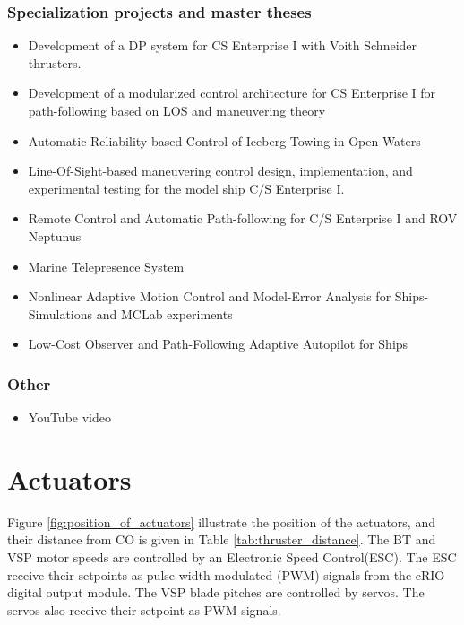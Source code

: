 \subsubsection{Specialization projects and master theses}
\begin{itemize}
	\item Development of a DP system for CS Enterprise I with Voith Schneider thrusters. \citep{Skaatun2011}
	\item Development of a modularized control architecture for CS Enterprise I for path-following based on LOS and maneuvering theory \citep{Tran2013}
	\item Automatic Reliability-based Control of Iceberg Towing in Open Waters \citep{Orsten2014}
	\item Line-Of-Sight-based maneuvering control design, implementation, and experimental testing for the model ship C/S Enterprise I.\citep{Tran2014}
	\item Remote Control and Automatic Path-following for C/S Enterprise I and ROV Neptunus \citep{Sandved2015}
	\item Marine Telepresence System \citep{Valle2015}
	\item Nonlinear Adaptive Motion Control and Model-Error Analysis for Ships-Simulations and MCLab experiments \citep{bjorne2016nonlinear}
	\item Low-Cost Observer and Path-Following Adaptive Autopilot for Ships \citep{mykland2017}
\end{itemize}
\subsubsection{Other}
\begin{itemize}
	\item YouTube video \citep{Skaatun2014}
\end{itemize}

\section{Actuators}
Figure \ref{fig:position_of_actuators} illustrate the position of the actuators, and their distance from CO is given in Table \ref{tab:thruster_distance}. The BT and VSP motor speeds are controlled by an Electronic Speed Control(ESC). The ESC receive their setpoints as pulse-width modulated (PWM) signals from the cRIO digital output module. The VSP blade pitches are controlled by servos. The servos also receive their setpoint as PWM signals. 

